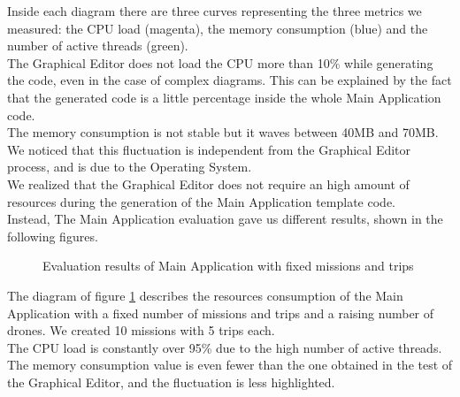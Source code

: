 Inside each diagram there are three curves representing the three metrics we measured: the CPU load (magenta), the memory consumption (blue) and the number of active threads (green).
\\
The Graphical Editor does not load the CPU more than 10\% while generating the code, even in the case of complex diagrams.
This can be explained by the fact that the generated code is a little percentage inside the whole Main Application code.
\\
The memory consumption is not stable but it waves between 40MB and 70MB.
We noticed that this fluctuation is independent from the Graphical Editor process, and is due to the Operating System.
\\
We realized that the Graphical Editor does not require an high amount of resources during the generation of the Main Application template code.
\\

Instead, The Main Application evaluation gave us different results, shown in the following figures.
\\

\begin{figure}[h!]
\centering
  \caption{Evaluation results of Main Application with fixed missions and trips}
  \label{fig:mainApp1}
\end{figure}

The diagram of figure \ref{fig:mainApp1} describes the resources consumption of the Main Application with a fixed number of missions and trips and a raising number of drones. We created 10 missions with 5 trips each.
\\
The CPU load is constantly over 95\% due to the high number of active threads.
The memory consumption value is even fewer than the one obtained in the test of the Graphical Editor, and the fluctuation is less highlighted.
\\

